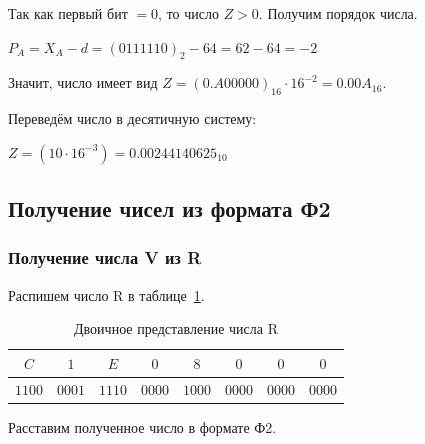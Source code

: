 Так как первый бит $= 0$, то число $Z > 0$. Получим порядок числа.

$P_{A}=X_{A}-d=(0111110)_{2}-64=62-64=-2$

Значит, число имеет вид $Z = (0.A00000)_{16} \cdot 16^{-2} = 0.00A_{16}$.

Переведём число в десятичную систему:

$Z=(10 \cdot 16^{-3})=0.00244140625_{10}$


\subsection{Получение чисел из формата Ф2}
\subsubsection{Получение числа V из R}

Распишем число R в таблице~\ref{tab:r-in-f2}.

\begin{table}[H]
    \centering
    \caption{Двоичное представление числа R}
    \label{tab:r-in-f2}
    \begin{tabular}{|c|c|c|c|c|c|c|c|}
        \hline
		$C$ & $1$ & $E$ & $0$ & $8$ & $0$ & $0$ & $0$ \\
		\hline
		$1100$ & $0001$ & $1110$ & $0000$ & $1000$ & $0000$ & $0000$ & $0000$ \\
        \hline
    \end{tabular}
\end{table}

Расставим полученное число в формате Ф2.


